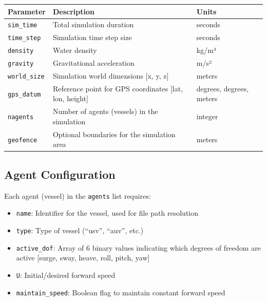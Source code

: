 \documentclass[
  letterpaper,
  DIV=11,
  numbers=noendperiod]{scrreprt}
\providecommand{\tightlist}{%
  \setlength{\itemsep}{0pt}\setlength{\parskip}{0pt}}\usepackage{longtable,booktabs,array}
\begin{document}
\begin{longtable}[]{@{}
  >{\raggedright\arraybackslash}p{}
  >{\raggedright\arraybackslash}p{}
  >{\raggedright\arraybackslash}p{}@{}}
\toprule\noalign{}
\begin{minipage}[b]{\linewidth}\raggedright
Parameter
\end{minipage} & \begin{minipage}[b]{\linewidth}\raggedright
Description
\end{minipage} & \begin{minipage}[b]{\linewidth}\raggedright
Units
\end{minipage} \\
\midrule\noalign{}
\endhead
\bottomrule\noalign{}
\endlastfoot
\texttt{sim\_time} & Total simulation duration & seconds \\
\texttt{time\_step} & Simulation time step size & seconds \\
\texttt{density} & Water density & kg/m³ \\
\texttt{gravity} & Gravitational acceleration & m/s² \\
\texttt{world\_size} & Simulation world dimensions {[}x, y, z{]} &
meters \\
\texttt{gps\_datum} & Reference point for GPS coordinates {[}lat, lon,
height{]} & degrees, degrees, meters \\
\texttt{nagents} & Number of agents (vessels) in the simulation &
integer \\
\texttt{geofence} & Optional boundaries for the simulation area &
meters \\
\end{longtable}

\subsection*{Agent Configuration}\label{agent-configuration}

Each agent (vessel) in the \texttt{agents} list requires:

\begin{itemize}
\tightlist
\item
  \texttt{name}: Identifier for the vessel, used for file path
  resolution
\item
  \texttt{type}: Type of vessel (``usv'', ``auv'', etc.)
\item
  \texttt{active\_dof}: Array of 6 binary values indicating which
  degrees of freedom are active {[}surge, sway, heave, roll, pitch,
  yaw{]}
\item
  \texttt{U}: Initial/desired forward speed
\item
  \texttt{maintain\_speed}: Boolean flag to maintain constant forward
  speed
\end{itemize}
\end{document}
